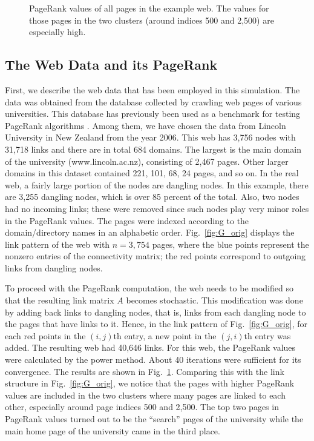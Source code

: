 \documentclass[11pt,draftcls,onecolumn]{IEEEtran}
\newcommand{\fig}[3]{\resizebox{#1}{#2}{\texttt{[image: \#3]}}}
\begin{document}
\begin{figure}[t]
  \centering
  \fig{9cm}{!}{PR_orig1.eps}
  \caption{PageRank values of all pages in the example web. The values for those pages in the
   two clusters (around indices 500 and 2,500) are especially high.}
  \label{fig:PageRank_values}
\end{figure}

\subsection*{The Web Data and its PageRank}

First, we describe the web data that has been employed in this simulation. 
The data was obtained from the database \cite{webdata} collected by crawling 
web pages of various universities.
This database has previously been used as a benchmark for testing PageRank algorithms \cite{FABG:13}.
Among them, we have chosen the data from Lincoln University in New Zealand from the year 2006.
This web has 3,756 nodes
with 31,718 links and there are in total 684 domains. 
The largest is the main domain of the university (www.lincoln.ac.nz), consisting of
2,467 pages. Other larger domains in this dataset contained
221, 101, 68, 24 pages, and so on. 
In the real web, 
a fairly large portion of the nodes are dangling nodes.
In this example, there are 3,255 dangling nodes, which is over 85 percent
of the total.
Also, two nodes had no incoming links; these were removed since 
such nodes play very minor roles in the PageRank values.
The pages were indexed according to the domain/directory names in an alphabetic order.
Fig.~\ref{fig:G_orig} displays the link pattern of the web with $n=3,754$ pages,
where the blue points represent the nonzero entries of the connectivity matrix;
the red points correspond to outgoing links from dangling nodes.

To proceed with the PageRank computation, the web needs to be modified
so that the resulting link matrix $A$ becomes stochastic. 
This modification was done by adding back links to dangling nodes, that is, links from each dangling 
node to the pages that have links to it. 
Hence, in the link pattern of Fig.~\ref{fig:G_orig},
for each red points in the $(i,j)$th entry, a new point in the $(j,i)$th entry was added.
The resulting web had 40,646 links.
For this web, the PageRank values were calculated by the power method. 
About 40 iterations were sufficient for its convergence. 
The results are shown in Fig.~\ref{fig:PageRank_values}. Comparing this with the
link structure in Fig.~\ref{fig:G_orig}, we notice that the pages with higher PageRank
values are included in the two clusters where many pages are linked to each other,
especially around page indices 500 and 2,500.
The top two pages in PageRank values turned out to be the ``search'' pages of the university
while the main home page of the university came in the third place. 
\end{document}
